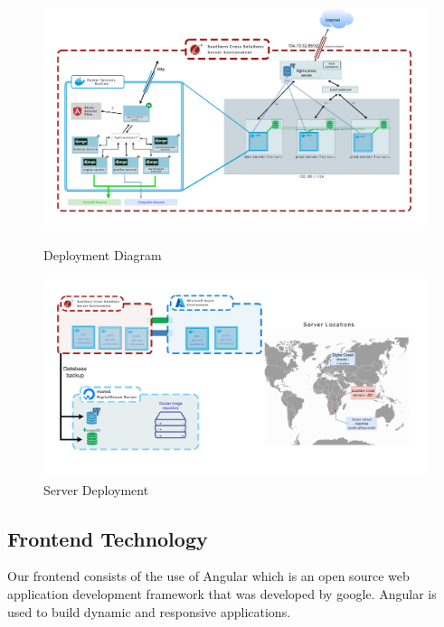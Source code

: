 \documentclass[12pt]{article}
\begin{document}
    \begin{figure}[ht]
        \begin{center}
            \includegraphics[width=1\textwidth]{images/domain-pulse-deployment.drawio.png}
        \end{center}
        \caption{Deployment Diagram}

        \begin{center}
            \includegraphics[width=1\textwidth]{images/domain-pulse-deployment-p2.png}
        \end{center}
        \caption{Server Deployment}
    \end{figure}

    \newpage

\subsection{Frontend Technology}
Our frontend consists of the use of Angular which is an open source web application development framework that was developed by google. Angular is used to build dynamic and responsive applications.
\end{document}
